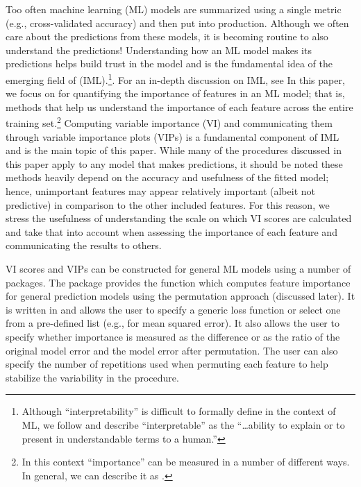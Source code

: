 Too often machine learning (ML) models are summarized using a single
metric (e.g., cross-validated accuracy) and then put into production.
Although we often care about the predictions from these models, it is
becoming routine to also understand the predictions! Understanding how
an ML model makes its predictions helps build trust in the model and is
the fundamental idea of the emerging field of
 (IML).\footnote{Although
  ``interpretability'' is difficult to formally define in the context of
  ML, we follow \citet{doshivelez-2017-rigorous} and describe
  ``interpretable'' as the ``\ldots{}ability to explain or to present in
  understandable terms to a human.''}. For an in-depth discussion on
IML, see \citet{molnar-2019-iml} In this paper, we focus on
 for quantifying the importance of features in an ML
model; that is, methods that help us understand the importance of each
feature across the entire training set.\footnote{In this context
  ``importance'' can be measured in a number of different ways. In
  general, we can describe it as
  .}
Computing variable importance (VI) and communicating them through
variable importance plots (VIPs) is a fundamental component of IML and
is the main topic of this paper. While many of the procedures discussed
in this paper apply to any model that makes predictions, it should be
noted these methods heavily depend on the accuracy and usefulness of the
fitted model; hence, unimportant features may appear relatively
important (albeit not predictive) in comparison to the other included
features. For this reason, we stress the usefulness of understanding the
scale on which VI scores are calculated and take that into account when
assessing the importance of each feature and communicating the results
to others.

VI scores and VIPs can be constructed for general ML models using a
number of packages. The  package \citep{R-iml} provides the
 function which computes feature importance for
general prediction models using the permutation approach (discussed
later). It is written in  \citep{R-R6} and allows the user
to specify a generic loss function or select one from a pre-defined list
(e.g.,  for mean squared error). It also allows the
user to specify whether importance is measured as the difference or as
the ratio of the original model error and the model error after
permutation. The user can also specify the number of repetitions used
when permuting each feature to help stabilize the variability in the
procedure.

